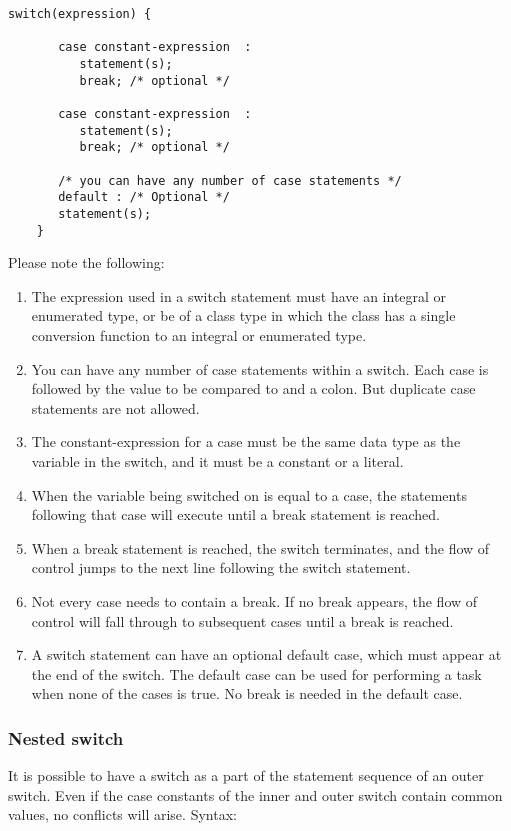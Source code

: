 \begin{lstlisting}[style=CStyle]
    switch(expression) {
    
       case constant-expression  :
          statement(s);
          break; /* optional */
    	
       case constant-expression  :
          statement(s);
          break; /* optional */
      
       /* you can have any number of case statements */
       default : /* Optional */
       statement(s);
    }
\end{lstlisting}

Please note the following:
\begin{enumerate}
    \item The expression used in a switch statement must have an integral or enumerated type, or be of a class type in which the class has a single conversion function to an integral or enumerated type.

    \item You can have any number of case statements within a switch. Each case is followed by the value to be compared to and a colon. But duplicate case statements are not allowed.

    \item The constant-expression for a case must be the same data type as the variable in the switch, and it must be a constant or a literal.

    \item When the variable being switched on is equal to a case, the statements following that case will execute until a break statement is reached.

    \item When a break statement is reached, the switch terminates, and the flow of control jumps to the next line following the switch statement.

    \item Not every case needs to contain a break. If no break appears, the flow of control will fall through to subsequent cases until a break is reached.

    \item A switch statement can have an optional default case, which must appear at the end of the switch. The default case can be used for performing a task when none of the cases is true. No break is needed in the default case.
    
\end{enumerate}

\subsubsection{Nested switch}
It is possible to have a switch as a part of the statement sequence of an outer switch. Even if the case constants of the inner and outer switch contain common values, no conflicts will arise. Syntax:

